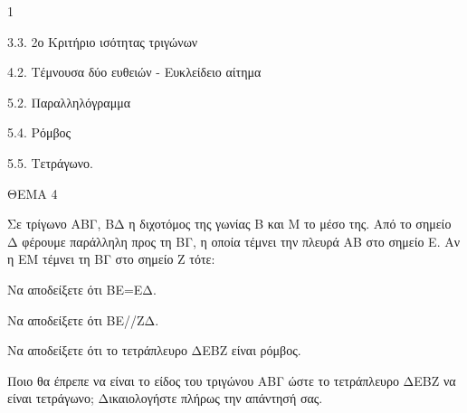 \begin{ylh}{1}
    \item 3.3. 2ο Κριτήριο ισότητας τριγώνων
    \item 4.2. Τέμνουσα δύο ευθειών - Ευκλείδειο αίτημα
    \item 5.2. Παραλληλόγραμμα
    \item 5.4. Ρόμβος
    \item 5.5. Τετράγωνο.
\end{ylh}

ΘΕΜΑ 4

Σε τρίγωνο ΑΒΓ, ΒΔ η διχοτόμος της γωνίας Β και Μ το μέσο της. Από το σημείο Δ φέρουμε παράλληλη προς τη ΒΓ, η οποία τέμνει την πλευρά ΑΒ στο σημείο Ε. Αν η ΕΜ τέμνει τη ΒΓ στο σημείο Ζ τότε:

\begin{alist}
\item Να αποδείξετε ότι ΒΕ=ΕΔ. 

\item Να αποδείξετε ότι ΒΕ//ΖΔ. 

\item Να αποδείξετε ότι το τετράπλευρο ΔΕΒΖ είναι ρόμβος. 

\item Ποιο θα έπρεπε να είναι το είδος του τριγώνου ΑΒΓ ώστε το τετράπλευρο ΔΕΒΖ να είναι τετράγωνο; Δικαιολογήστε πλήρως την απάντησή σας. 
\end{alist}
